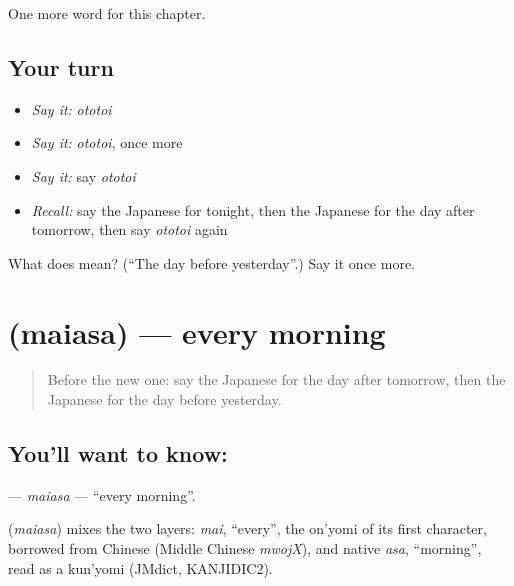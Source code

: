 \begin{grammarlens}[title={What you've built}]
One more word for this chapter.
\end{grammarlens}

\subsection*{Your turn}
\begin{itemize}
\raggedright
  \item \emph{Say it:} \emph{ototoi}
  \item \emph{Say it:} \emph{ototoi}, once more
  \item \emph{Say it:} say \emph{ototoi}
  \item \emph{Recall:} say the Japanese for tonight, then the Japanese for the day after tomorrow, then say \emph{ototoi} again
\end{itemize}

\begin{tcolorbox}[breakable,colback=teal!4,colframe=teal!35!black,title={Before you move on}]
What does  mean? (\textquotedblleft{}The day before yesterday\textquotedblright{}.) Say it once more.
\end{tcolorbox}
\section[\texorpdfstring{\ja{まいあさ} (maiasa)}{まいあさ (maiasa)}]{ (maiasa) — every morning}

\label{lesson:JA-C73-maiasa}



\begin{quote}
Before the new one: say the Japanese for the day after tomorrow, then the Japanese for the day before yesterday.
\end{quote}

\subsection*{You'll want to know: }
\textbf{} — \emph{maiasa} — \textquotedblleft{}every morning\textquotedblright{}.

\begin{cousinweb}
\textbf{} (\emph{maiasa}) mixes the two layers: \emph{mai}, \textquotedblleft{}every\textquotedblright{}, the on'yomi of its first character, borrowed from Chinese (Middle Chinese \emph{mwojX}), and native \emph{asa}, \textquotedblleft{}morning\textquotedblright{}, read as a kun'yomi (JMdict, KANJIDIC2).
\end{cousinweb}

